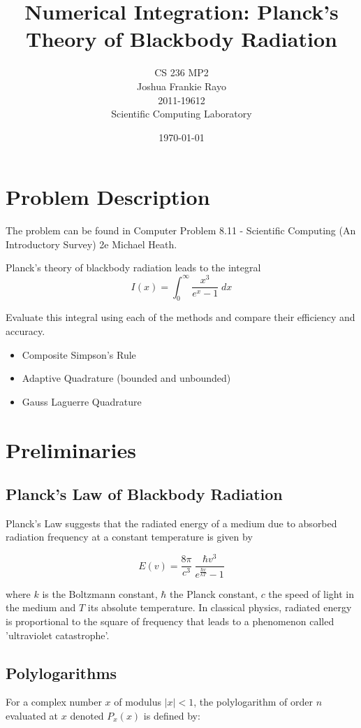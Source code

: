 \documentclass[a4paper, 11pt]{article}
\title{Numerical Integration: Planck's Theory of Blackbody Radiation}
\author{CS 236 MP2\\ Joshua Frankie Rayo\\ 2011-19612\\ Scientific Computing Laboratory}
\date{\today}
\begin{document}
\maketitle

\tableofcontents
\listoffigures
\listoftables

\section{Problem Description}
The problem can be found in Computer Problem 8.11 - Scientific Computing (An Introductory Survey) 2e Michael Heath. \cite{bib:sci}

Planck's theory of blackbody radiation leads to the integral
\begin{equation}\label{eqn:planck}
I(x) = \int_0^{\infty} \frac{x^3}{e^x-1}\;dx
\end{equation}

Evaluate this integral using each of the methods and compare their efficiency and accuracy.
\begin{itemize}
	\item Composite Simpson's Rule
	\item Adaptive Quadrature (bounded and unbounded)
	\item Gauss Laguerre Quadrature
\end{itemize}

\section{Preliminaries}
\subsection{Planck's Law of Blackbody Radiation}
Planck's Law suggests that the radiated energy of a medium due to absorbed radiation frequency at a constant temperature is given by

\begin{equation*}
E(v) = \frac{8\pi}{c^3} \ \frac{\hbar v^3}{e^{\frac{\hbar v}{kT}}-1}
\end{equation*}

where $k$ is the Boltzmann constant, $\hbar$ the Planck constant, $c$ the speed of light in the medium and $T$ its absolute temperature. In classical physics, radiated energy is proportional to the square of frequency that leads to a phenomenon called 'ultraviolet catastrophe'.

\subsection{Polylogarithms}
For a complex number $x$ of modulus $|x|<1$, the polylogarithm of order $n$ evaluated at $x$ denoted $P_x(x)$ is defined by:
\end{document}
